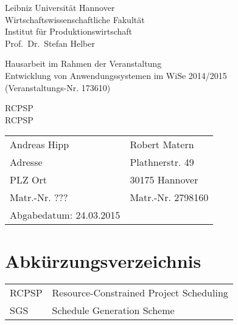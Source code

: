 \documentclass[a4paper,12pt,parskip,bibtotoc,liststotoc]{article}
\begin{document}
%
%
\thispagestyle{empty}  %
Leibniz Universität Hannover\\
Wirtschaftswissenschaftliche Fakultät\\
Institut für Produktionswirtschaft\\
Prof.\ Dr.\ Stefan Helber

\vspace{5cm}

\begin{center}
Hausarbeit im Rahmen der Veranstaltung \\
Entwicklung von Anwendungssystemen  im WiSe 2014/2015 \\
(Veranstaltungs-Nr. 173610)

\vspace{2.5cm}

{\Large RCPSP \\
RCPSP}
\end{center}

\vspace{5.5cm}


\begin{table}[h!]
    \vspace*{-3mm}
    \hspace*{2mm}
  \renewcommand{\arraystretch}{1,5}
    \begin{tabular}{ll}
Andreas Hipp &Robert Matern \\
Adresse&Plathnerstr. 49 \\
PLZ Ort&30175 Hannover \\
Matr.-Nr. ???&Matr.-Nr. 2798160 \\[3mm]
Abgabedatum: 24.03.2015
	\end{tabular}
\end{table}

\newpage

\tableofcontents

\newpage  %

\listoffigures

\listoftables
\newpage
\section*{Abkürzungsverzeichnis}
\begin{table}[h!]
    \vspace*{-3mm}
    \hspace*{2mm}
  \renewcommand{\arraystretch}{1,5}
    \begin{tabular}{ll}  %
           RCPSP      & Resource-Constrained Project Scheduling \\
SGS & Schedule Generation Scheme\\
	\end{tabular}
\end{table}
\newpage
\end{document}
